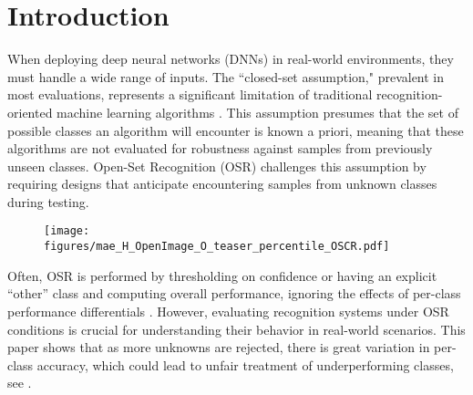\section{Introduction}
\label{sec:intro}

When deploying deep neural networks (DNNs) in real-world environments, they must handle a wide range of inputs.
The ``closed-set assumption," prevalent in most evaluations, represents a significant limitation of traditional recognition-oriented machine learning algorithms \cite{scheirer2012toward}.
This assumption presumes that the set of possible classes an algorithm will encounter is known a priori, meaning that these algorithms are not evaluated for robustness against samples from previously unseen classes.
Open-Set Recognition (OSR) challenges this assumption by requiring designs that anticipate encountering samples from unknown classes during testing.

\begin{figure}[t!]
  \centerline{\texttt{[image: figures/mae\_H\_OpenImage\_O\_teaser\_percentile\_OSCR.pdf]}}
\end{figure}

Often, OSR is performed by thresholding on confidence \cite{hendrycks17baseline,vaze2022openset} or having an explicit ``other'' class \cite{ge2017gopenmax} and computing overall performance, ignoring the effects of per-class performance differentials \cite{li2023accurate}.
However, evaluating recognition systems under OSR conditions is crucial for understanding their behavior in real-world scenarios.
This paper shows that as more unknowns are rejected, there is great variation in per-class accuracy, which could lead to unfair treatment of underperforming classes, see .

